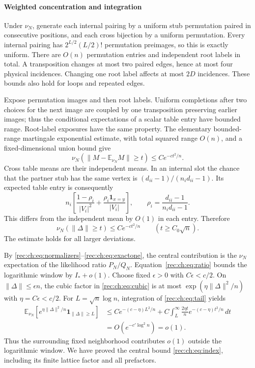\documentclass[11pt]{article}
\theoremstyle{definition}
\theoremstyle{remark}
\newcommand{\E}{\mathbb E}
\newcommand{\1}{\mathbf 1}
\providecommand{\one}{\mathbf 1}
\begin{document}
\paragraph{Weighted concentration and integration}
Under $\nu_N$, generate each internal pairing by a uniform stub permutation paired in consecutive positions, and each cross bijection by a uniform permutation. Every internal pairing has $2^{L/2}(L/2)!$ permutation preimages, so this is exactly uniform. There are $O(n)$ permutation entries and independent root labels in total. A transposition changes at most two paired edges, hence at most four physical incidences. Changing one root label affects at most $2D$ incidences. These bounds also hold for loops and repeated edges.

Expose permutation images and then root labels. Uniform completions after two choices for the next image are coupled by one transposition preserving earlier images; thus the conditional expectations of a scalar table entry have bounded range. Root-label exposures have the same property. The elementary bounded-range martingale exponential estimate, with total squared range $O(n)$, and a fixed-dimensional union bound give
\[
 \nu_N(\|M-\E_{\nu_N}M\|\ge t)\le Ce^{-ct^2/n}.
\]
Cross table means are their independent means. In an internal slot the chance that the partner stub has the same vertex is $(d_{ii}-1)/(n_id_{ii}-1)$. Its expected table entry is consequently
\[
 n_i\left[\frac{1-\rho_i}{|V_i|^2}
       +\frac{\rho_i\one_{x=y}}{|V_i|}\right],
 \qquad\rho_i=\frac{d_{ii}-1}{n_id_{ii}-1}.
\]
This differs from the independent mean by $O(1)$ in each entry. Therefore
\begin{equation}\label{rec:ch:eq:tail}
 \nu_N(\|\Delta\|\ge t)\le Ce^{-ct^2/n}\qquad(t\ge C_0\sqrt n).
\end{equation}
The estimate holds for all larger deviations.

By \eqref{rec:ch:eq:normalizers}--\eqref{rec:ch:eq:exactone}, the central contribution is the $\nu_N$ expectation of the likelihood ratio $P_N/Q_N$. Equation~\eqref{rec:ch:eq:ratio} bounds the logarithmic window by $I_*+o(1)$. Choose fixed $\epsilon>0$ with $C\epsilon<c/2$. On $\|\Delta\|\le\epsilon n$, the cubic factor in \eqref{rec:ch:eq:cubic} is at most $\exp(\eta\|\Delta\|^2/n)$ with $\eta=C\epsilon<c/2$. For $L=\sqrt n\log n$, integration of \eqref{rec:ch:eq:tail} yields
\begin{align*}
 \E_{\nu_N}\left[e^{\eta\|\Delta\|^2/n}\one_{\|\Delta\|\ge L}\right]
 &\le Ce^{-(c-\eta)L^2/n}
 +C\int_L^\infty\frac{2\eta t}{n}e^{-(c-\eta)t^2/n}\,dt\\
 &=O(e^{-c'\log^2n})=o(1).
\end{align*}
Thus the surrounding fixed neighborhood contributes $o(1)$ outside the logarithmic window. We have proved the central bound \eqref{rec:ch:eq:index}, including its finite lattice factor and all prefactors.
\end{document}
